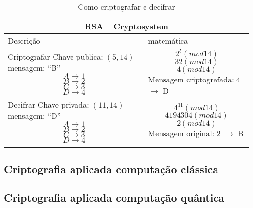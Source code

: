 \vspace{1cm}
\begin{longtable}{ |p{6cm}|| p{8cm}|  }
  \hline
  \multicolumn{2}{|c|}{RSA – Cryptosystem} \\
  \hline
    Descrição & matemática\\
  \hline
    Criptografar \newline
    Chave publica: $(5, 14)$ \newline
    mensagem: ``B'' 
    \[A \to 1\]
    \[B \to 2\]
    \[C \to 3\]
    \[D \to 4\] & 
    \[2^5(mod 14)\]
    \[32(mod 14)\]
    \[4(mod 14)\]
    Mensagem criptografada: 4 $\to$ D\\
  \hline
    Decifrar \newline
    Chave privada: $(11, 14)$ \newline
    mensagem: ``D'' 
    \[A \to 1\]
    \[B \to 2\]
    \[C \to 3\]
    \[D \to 4\] & 
    \[4^{11}(mod 14)\]
    \[4194304(mod 14)\]
    \[2(mod 14)\]
    Mensagem original: 2 $\to$ B\\
  \hline
  \caption{Como criptografar e decifrar}
  \label{table:4}
\end{longtable}

\subsection{Criptografia aplicada computação clássica}
\subsection{Criptografia aplicada computação quântica}
\newpage

